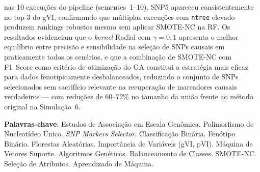 \documentclass[
    12pt,
    a4paper,
    oneside,
    english,
    french,
    spanish,
    brazil
    ]{abntex2}
\begin{document}
\begin{SingleSpace}
nas 10 execuções do pipeline (sementes~1--10), SNP5 apareceu consistentemente no
top-3 do gVI, confirmando que múltiplas execuções com \texttt{ntree} elevado
produzem rankings robustos mesmo sem aplicar SMOTE-NC na RF. Os resultados evidenciam que o \emph{kernel} Radial com $\gamma = 0{,}1$
apresenta o melhor equilíbrio entre precisão e sensibilidade na seleção de SNPs
causais em praticamente todos os cenários, e que a combinação de SMOTE-NC com
F1~Score como critério de otimização do GA constitui a estratégia mais eficaz
para dados fenotipicamente desbalanceados, reduzindo o conjunto de SNPs
selecionados sem sacrifício relevante na recuperação de marcadores causais
verdadeiros --- com reduções de 60--72\% no tamanho da união frente ao método
original na Simulação~6.

\noindent\textbf{Palavras-chave}: Estudos de Associação em Escala Genômica.
Polimorfismo de Nucleotídeo Único.
\textit{SNP Markers Selector}.
Classificação Binária.
Fenótipo Binário.
Florestas Aleatórias.
Importância de Variáveis (gVI, pVI).
Máquina de Vetores Suporte.
Algoritmos Genéticos.
Balanceamento de Classes.
SMOTE-NC.
Seleção de Atributos.
Aprendizado de Máquina.
\end{SingleSpace}

\clearpage

\end{document}

